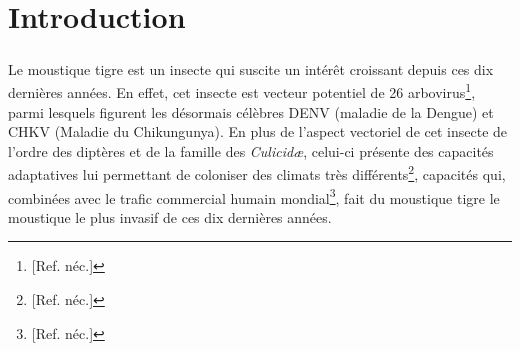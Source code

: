 \chapter{Introduction}

\paragraph{}

Le moustique tigre  est un insecte qui suscite un intérêt croissant depuis ces dix dernières années.
En effet, cet insecte est vecteur potentiel de 26 arbovirus\footnote{[Ref. néc.]}, parmi lesquels figurent les désormais célèbres DENV (maladie de la Dengue) et CHKV (Maladie du Chikungunya).
En plus de l'aspect vectoriel de cet insecte de l'ordre des diptères et de la famille des \textit{Culicidæ}, celui-ci présente des capacités adaptatives lui permettant de coloniser des climats très différents\footnote{[Ref. néc.]}, capacités qui, combinées avec le trafic commercial humain mondial\footnote{[Ref. néc.]}, fait du moustique tigre le moustique le plus invasif de ces dix dernières années.